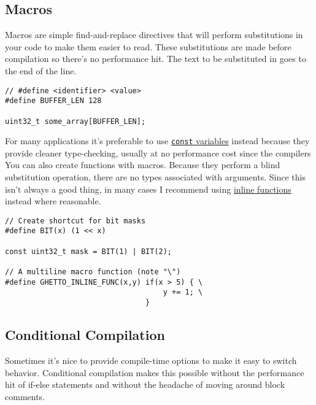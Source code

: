\documentclass[10pt]{article}
\begin{document}

\subsection{Macros}
Macros are simple find-and-replace directives that will perform substitutions in your code to make them easier to read. These substitutions are made before compilation so there's no performance hit. The text to be substituted in goes to the end of the line.
\begin{lstlisting}[label=lst-macro,caption=Macros]
// #define <identifier> <value>
#define BUFFER_LEN 128

uint32_t some_array[BUFFER_LEN];
\end{lstlisting}

For many applications it's preferable to use \hyperref[sec:const]{\texttt{const} variables} instead because they provide cleaner type-checking, usually at no performance cost since the compilers  \\

You can also create functions with macros. Because they perform a blind substitution operation, there are no types associated with arguments. Since this isn't always a good thing, in many cases I recommend using \hyperref[sec:inline]{inline functions} instead where reasonable.
\begin{lstlisting}[label=lst-macro-function,caption=Macro functions]
// Create shortcut for bit masks
#define BIT(x) (1 << x)

const uint32_t mask = BIT(1) | BIT(2);

// A multiline macro function (note "\")
#define GHETTO_INLINE_FUNC(x,y) if(x > 5) { \
                                	y += 1; \
                                }
\end{lstlisting}

\subsection{Conditional Compilation}\label{sec:cond-compilation}
Sometimes it's nice to provide compile-time options to make it easy to switch behavior. Conditional compilation makes this possible without the performance hit of if-else statements and without the headache of moving around block comments.
\end{document}
